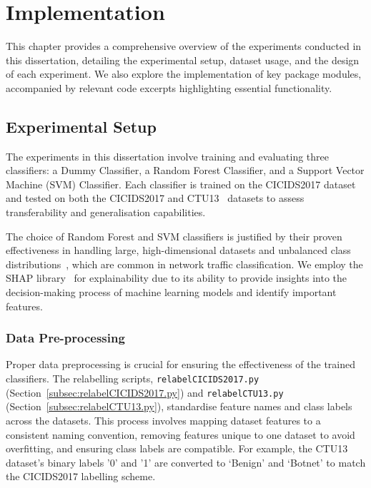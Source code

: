 \chapter{Implementation}
This chapter provides a comprehensive overview of the experiments conducted in this dissertation, detailing the experimental setup, dataset usage, and the design of each experiment. We also explore the implementation of key package modules, accompanied by relevant code excerpts highlighting essential functionality.

\section{Experimental Setup}\label{sec:experimental-setup}
The experiments in this dissertation involve training and evaluating three classifiers: a Dummy Classifier, a Random Forest Classifier, and a Support Vector Machine (SVM) Classifier. Each classifier is trained on the CICIDS2017 dataset~\cite{sharafaldin2018toward} and tested on both the CICIDS2017 and CTU13~\cite{garcia2014empirical} datasets to assess transferability and generalisation capabilities.

The choice of Random Forest and SVM classifiers is justified by their proven effectiveness in handling large, high-dimensional datasets and unbalanced class distributions~\cite{farnaaz2016random, teng2017svm}, which are common in network traffic classification. We employ the SHAP library~\cite{lundberg2017unified} for explainability due to its ability to provide insights into the decision-making process of machine learning models and identify important features.

\subsection{Data Pre-processing}\label{subsec:pre-processing}
Proper data preprocessing is crucial for ensuring the effectiveness of the trained classifiers. The relabelling scripts, \texttt{relabelCICIDS2017.py} (Section~\ref{subsec:relabelCICIDS2017.py}) and \texttt{relabelCTU13.py} (Section~\ref{subsec:relabelCTU13.py}), standardise feature names and class labels across the datasets. This process involves mapping dataset features to a consistent naming convention, removing features unique to one dataset to avoid overfitting, and ensuring class labels are compatible. For example, the CTU13 dataset's binary labels '0' and '1' are converted to `Benign' and `Botnet' to match the CICIDS2017 labelling scheme.

